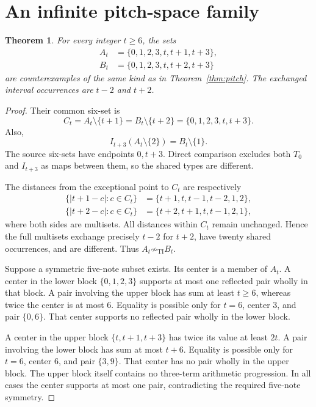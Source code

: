\documentclass[10pt]{article}
\newtheorem{theorem}{Theorem}
\theoremstyle{remark}
\newcommand{\ti}{\sim_{\mathrm{TI}}}
\begin{document}
\section{An infinite pitch-space family}
\begin{theorem}\label{thm:family}
For every integer $t\ge6$, the sets
\[
\begin{split}
 A_t&=\{0,1,2,3,t,t+1,t+3\},\\
 B_t&=\{0,1,2,3,t,t+2,t+3\}
\end{split}
\]
are counterexamples of the same kind as in Theorem~\ref{thm:pitch}.
The exchanged interval occurrences are $t-2$ and $t+2$.
\end{theorem}
\begin{proof}
Their common six-set is
\[
 C_t=A_t\setminus\{t+1\}=B_t\setminus\{t+2\}
     =\{0,1,2,3,t,t+3\}.
\]
Also,
\[
 I_{t+3}(A_t\setminus\{2\})=B_t\setminus\{1\}.
\]
The source six-sets have endpoints $0,t+3$. Direct comparison excludes both
$T_0$ and $I_{t+3}$ as maps between them, so the shared types are different.

The distances from the exceptional point to $C_t$ are respectively
\[
\begin{split}
 \{|t+1-c|:c\in C_t\}&=\{t+1,t,t-1,t-2,1,2\},\\
 \{|t+2-c|:c\in C_t\}&=\{t+2,t+1,t,t-1,2,1\},
\end{split}
\]
where both sides are multisets. All distances within $C_t$ remain unchanged.
Hence the full multisets exchange precisely $t-2$ for $t+2$, have twenty
shared occurrences, and are different. Thus $A_t\not\ti B_t$.

Suppose a symmetric five-note subset exists. Its center is a member of
$A_t$. A center in the lower block $\{0,1,2,3\}$ supports at most one
reflected pair wholly in that block. A pair involving the upper block has
sum at least $t\ge6$, whereas twice the center is at most $6$. Equality
is possible only for $t=6$, center $3$, and pair $\{0,6\}$. That center
supports no reflected pair wholly in the lower block.

A center in the upper block $\{t,t+1,t+3\}$ has twice its value at least
$2t$. A pair involving the lower block has sum at most $t+6$. Equality is
possible only for $t=6$, center $6$, and pair $\{3,9\}$. That center has no
pair wholly in the upper block. The upper block itself contains no
three-term arithmetic progression. In all cases the center supports at
most one pair, contradicting the required five-note symmetry.
\end{proof}
\end{document}
